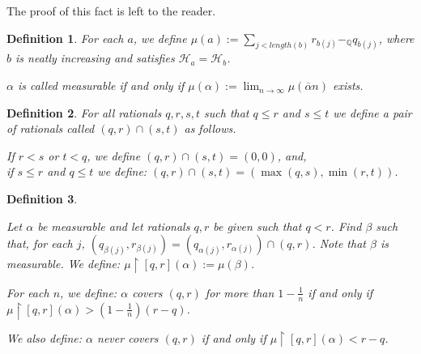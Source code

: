 \documentclass[a4paper]{amsart}
\theoremstyle{plain}
\newtheorem{definition}{Definition}
\begin{document}
 The proof of this fact is left to the reader.
 
 \begin{definition} For each $a$, we define  $\mu(a) := \sum_{j<length(b)} r_{b(j)}-_\mathbb{Q} q_{b(j)}$, where $b$ is neatly increasing and satisfies $\mathcal{H}_a =\mathcal{H}_b$. 
  
   
  
  \medskip  $\alpha$ is called \emph{measurable} if and only if $\mu(\alpha):=\lim_{n\rightarrow \infty} \mu( \overline \alpha n)$ exists.   \end{definition}
  
  \begin{definition}\label{D:intersectionsegments} For all rationals $q,r,s,t$ such that $q\le r$ and $s\le t$ we define a pair of rationals called  $(q,r)\cap(s,t)$ as follows.
  
  If $r<s$ or $t<q$, we define  $(q,r)\cap(s,t)= (0,0)$, and,\\ if $s\le r$ and $q\le t$ we define: $(q,r)\cap (s,t)=(\max (q,s), \min(r,t))$. \end{definition}
  
  \begin{definition}\label{D:localizingmeasure}
  
  Let $\alpha$ be measurable and let rationals $q,r$ be given such that $q< r$. Find $\beta$ such that, for each $j$, $(q_{\beta(j)}, r_{\beta(j)})=(q_{\alpha(j)}, r_{\alpha(j)})\cap(q,r)$.   Note that $\beta$ is measurable. We define: $\mu\upharpoonright[q,r](\alpha):= \mu(\beta)$. 
  
   
   
   For each $n$, we define: \emph{$\alpha$ covers $(q,r)$ for more than $1-\frac{1}{n}$} if and only if  \\$\mu\upharpoonright[q,r](\alpha)> (1-\frac{1}{n})(r-q)$.
   
   We also define: \emph{$\alpha$ never covers $(q,r)$} if and only if $\mu\upharpoonright[q,r](\alpha) <r-q$.\end{definition}
   
\end{document}
